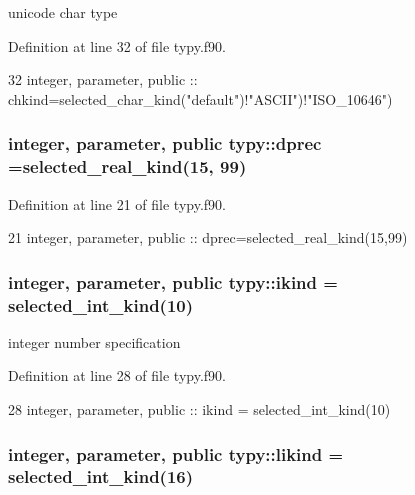 unicode char type 



Definition at line 32 of file typy.\+f90.


\begin{DoxyCode}
32     \textcolor{keywordtype}{integer}, \textcolor{keywordtype}{parameter}, \textcolor{keywordtype}{public} :: chkind=selected\_char\_kind(\textcolor{stringliteral}{"default"})\textcolor{comment}{!"ASCII")!"ISO\_10646")}
\end{DoxyCode}
\subsubsection[{dprec}]{\setlength{\rightskip}{0pt plus 5cm}integer, parameter, public typy\+::dprec =selected\+\_\+real\+\_\+kind(15, 99)}\label{namespacetypy_ae0f8e139f705c6faa45237bccab7f898}


Definition at line 21 of file typy.\+f90.


\begin{DoxyCode}
21     \textcolor{keywordtype}{integer}, \textcolor{keywordtype}{parameter}, \textcolor{keywordtype}{public} :: dprec=selected\_real\_kind(15,99) 
\end{DoxyCode}
\subsubsection[{ikind}]{\setlength{\rightskip}{0pt plus 5cm}integer, parameter, public typy\+::ikind = selected\+\_\+int\+\_\+kind(10)}\label{namespacetypy_a80b310812529ce60b2aec26670db402c}


integer number specification 



Definition at line 28 of file typy.\+f90.


\begin{DoxyCode}
28     \textcolor{keywordtype}{integer}, \textcolor{keywordtype}{parameter}, \textcolor{keywordtype}{public} :: ikind = selected\_int\_kind(10)
\end{DoxyCode}
\subsubsection[{likind}]{\setlength{\rightskip}{0pt plus 5cm}integer, parameter, public typy\+::likind = selected\+\_\+int\+\_\+kind(16)}\label{namespacetypy_a2d07d3bd8360ffc201ade93859a7cc84}


